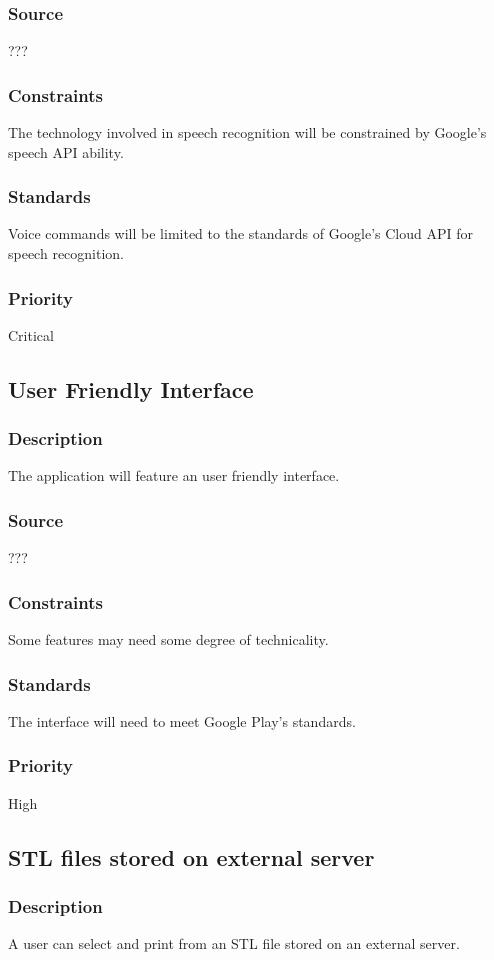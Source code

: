 \subsubsection{Source}
???
\subsubsection{Constraints}
The technology involved in speech recognition will be constrained by Google's speech API ability. 
\subsubsection{Standards}
Voice commands will be limited to the standards of Google's Cloud API for speech recognition. 
\subsubsection{Priority}
Critical
\subsection{User Friendly Interface}
\subsubsection{Description}
The application will feature an user friendly interface.
\subsubsection{Source}
???
\subsubsection{Constraints}
Some features may need some degree of technicality. 
\subsubsection{Standards}
The interface will need to meet Google Play's standards.
\subsubsection{Priority}
High
\subsection{STL files stored on external server}
\subsubsection{Description}
A user can select and print from an STL file stored on an external server.
